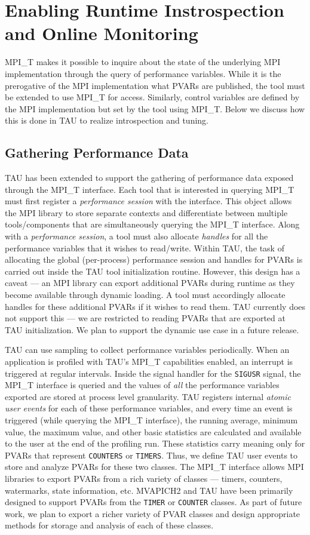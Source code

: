 \section{Enabling Runtime Instrospection and Online Monitoring}
MPI\_T makes it possible to inquire about the state of the underlying MPI implementation through the query of performance variables. While it is the prerogative of the MPI implementation what PVARs are published, the tool must be extended to use MPI\_T for access. Similarly, control variables are defined by the MPI implementation but set by the tool using MPI\_T. Below we discuss how this is done in TAU to realize introspection and tuning.
\subsection{Gathering Performance Data}
TAU has been extended to support the gathering of performance data exposed through the MPI\_T interface. Each tool that is interested in querying MPI\_T must first register a \textit{performance session} with the interface. This object allows the MPI library to store separate contexts and differentiate between multiple tools/components that are simultaneously querying the MPI\_T interface. Along with a \textit{performance session}, a tool must also allocate \textit{handles} for all the performance variables that it wishes to read/write. Within TAU, the task of allocating the global (per-process) performance session and handles for PVARs is carried out inside the TAU tool initialization routine. However, this design has a caveat --- an MPI library can export additional PVARs during runtime as they become available through dynamic loading. A tool must accordingly allocate handles for these additional PVARs if it wishes to read them. TAU currently does not support this --- we are restricted to reading PVARs that are exported at TAU initialization. We plan to support the dynamic use case in a future release.
\par TAU can use sampling to collect performance variables periodically. When an application is profiled with TAU's MPI\_T capabilities enabled, an interrupt is triggered at regular intervals. Inside the signal handler for the \verb+SIGUSR+ signal, the MPI\_T interface is queried and the values of \textit{all} the performance variables exported are stored at process level granularity. TAU registers internal \textit{atomic user events} for each of these performance variables, and every time an event is triggered (while querying the MPI\_T interface), the running average, minimum value, the maximum value, and other basic statistics are calculated and available to the user at the end of the profiling run. These statistics carry meaning only for PVARs that represent \verb+COUNTERS+ or \verb+TIMERS+. Thus, we define TAU user events to store and analyze PVARs for these two classes. The MPI\_T interface allows MPI libraries to export PVARs from a rich variety of classes --- timers, counters, watermarks, state information, etc. MVAPICH2 and TAU have been primarily designed to support PVARs from the \verb+TIMER+ or \verb+COUNTER+ classes. As part of future work, we plan to export a richer variety of PVAR classes and design appropriate methods for storage and analysis of each of these classes.
